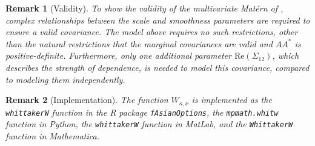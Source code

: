\documentclass[11pt]{article}
\newtheorem*{remark}{Remark}
\begin{document}
\begin{remark}[Validity] \normalfont
To show the validity of the multivariate Mat\'ern of \cite{gneiting_matern_2010}, complex relationships between the scale and smoothness parameters are required to ensure a valid covariance. The model above requires no such restrictions, other than the natural restrictions that the marginal covariances are valid and $AA^*$ is positive-definite. Furthermore, only one additional parameter $\textrm{Re}(\Sigma_{12})$, which describes the strength of dependence, is needed to model this covariance, compared to modeling them independently.
\end{remark}

\begin{remark}[Implementation] \normalfont
The function $W_{\kappa, \nu}$ is implemented as the \texttt{whittakerW} function in the R package \texttt{fAsianOptions}, the \texttt{mpmath.whitw} function in Python, the \texttt{whittakerW} function in MatLab, and the \texttt{WhittakerW} function in Mathematica.
\end{remark}
\end{document}
